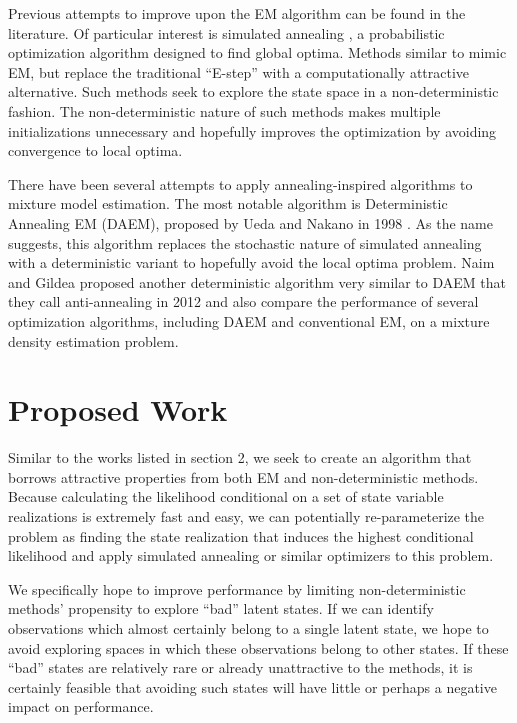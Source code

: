 \documentclass{article}
\theoremstyle{definition}
\begin{document}
Previous attempts to improve upon the EM algorithm can be found in the literature. Of particular interest is simulated annealing \cite{kirkpatrickgelattvecchi83}, a probabilistic optimization algorithm designed to find global optima. Methods similar to \cite{kirkpatrickgelattvecchi83} mimic EM, but replace the traditional ``E-step'' with a computationally attractive alternative. Such methods seek to explore the state space in a non-deterministic fashion. The non-deterministic nature of such methods makes multiple initializations unnecessary and hopefully improves the optimization by avoiding convergence to local optima.

There have been several attempts to apply annealing-inspired algorithms to mixture model estimation. The most notable algorithm is Deterministic Annealing EM (DAEM), proposed by Ueda and Nakano in 1998 \cite{uedanakano98}. As the name suggests, this algorithm replaces the stochastic nature of simulated annealing with a deterministic variant to hopefully avoid the local optima problem. Naim and Gildea proposed another deterministic algorithm very similar to DAEM that they call anti-annealing in 2012 \cite{naimgildea12} and also compare the performance of several optimization algorithms, including DAEM and conventional EM, on a mixture density estimation problem.


\section{Proposed Work}

Similar to the works listed in section 2, we seek to create an algorithm that borrows attractive properties from both EM and non-deterministic methods.
Because calculating the likelihood conditional on a set of state variable realizations is extremely fast and easy, we can potentially re-parameterize the problem as finding the state realization that induces the highest conditional likelihood and apply simulated annealing or similar optimizers to this problem.

We specifically hope to improve performance by limiting non-deterministic methods' propensity to explore ``bad'' latent states. If we can identify observations which almost certainly belong to a single latent state, we hope to avoid exploring spaces in which these observations belong to other states. If these ``bad'' states are relatively rare or already unattractive to the methods, it is certainly feasible that avoiding such states will have little or perhaps a negative impact on performance.
\end{document}
